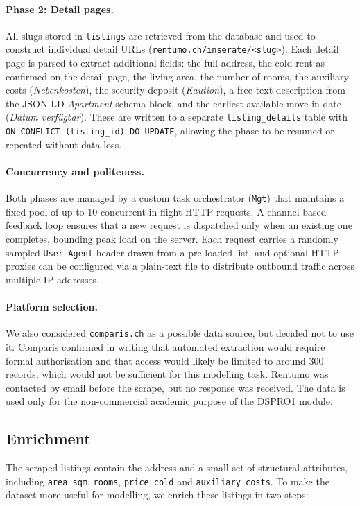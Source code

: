 \documentclass[11pt,a4paper]{article}
\begin{document}
\paragraph{Phase 2: Detail pages.}
All slugs stored in \texttt{listings} are retrieved from the database and used to construct individual detail URLs (\texttt{rentumo.ch/inserate/<slug>}). Each detail page is parsed to extract additional fields: the full address, the cold rent as confirmed on the detail page, the living area, the number of rooms, the auxiliary costs (\emph{Nebenkosten}), the security deposit (\emph{Kaution}), a free-text description from the JSON-LD \emph{Apartment} schema block, and the earliest available move-in date (\emph{Datum verfügbar}). These are written to a separate \texttt{listing\_details} table with \texttt{ON CONFLICT (listing\_id) DO UPDATE}, allowing the phase to be resumed or repeated without data loss.

\paragraph{Concurrency and politeness.}
Both phases are managed by a custom task orchestrator (\texttt{Mgt}) that maintains a fixed pool of up to 10 concurrent in-flight HTTP requests. A channel-based feedback loop ensures that a new request is dispatched only when an existing one completes, bounding peak load on the server. Each request carries a randomly sampled \texttt{User-Agent} header drawn from a pre-loaded list, and optional HTTP proxies can be configured via a plain-text file to distribute outbound traffic across multiple IP addresses.

\paragraph{Platform selection.}
We also considered \texttt{comparis.ch} as a possible data source, but decided not to use it. Comparis confirmed in writing that automated extraction would require formal authorisation and that access would likely be limited to around 300 records, which would not be sufficient for this modelling task. Rentumo was contacted by email before the scrape, but no response was received. The data is used only for the non-commercial academic purpose of the DSPRO1 module.

\subsection{Enrichment}
The scraped listings contain the address and a small set of structural attributes, including \texttt{area\_sqm}, \texttt{rooms}, \texttt{price\_cold} and \texttt{auxiliary\_costs}. To make the dataset more useful for modelling, we enrich these listings in two steps:
\end{document}

